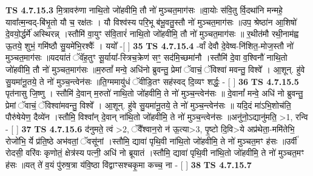 \documentclass[17pt]{extarticle}
\begin{document}
                  \newline
                                \textbf{ TS 4.7.15.3} \newline
                  मि॒त्रावरु॑णा नाथि॒तो जो॑हवीमि॒ तौ नो॑ मुञ्चत॒माग॑सः ॥वा॒योः स॑वि॒तु र्वि॒दथा॑नि मन्महे॒ यावा᳚त्म॒न्वद्-बि॑भृ॒तो यौ च॒ रक्ष॑तः । यौ विश्व॑स्य परि॒भू ब॑भू॒वतु॒स्तौ नो॑ मुञ्चत॒माग॑सः ॥उप॒ श्रेष्ठा॑न आ॒शिषो॑ दे॒वयो॒र्द्धर्मे॑ अस्थिरन्न् ।स्तौमि॑ वा॒युꣳ स॑वि॒तारं॑ नाथि॒तो जो॑हवीमि॒ तौ नो॑ मुञ्चत॒माग॑सः ॥ र॒थीत॑मौ रथी॒नाम॑ह्व ऊ॒तये॒ शुभं॒ गमि॑ष्ठौ सु॒यमे॑भि॒रश्वैः᳚ । ययो᳚ -[  ] \textbf{  35} \newline
                  \newline
                                \textbf{ TS 4.7.15.4} \newline
                  -र्वां देवौ दे॒वेष्व-नि॑शित॒-मोज॒स्तौ नो॑ मुञ्चत॒माग॑सः ॥यदया॑तं ॅवॅह॒तुꣳ सू॒र्याया᳚-स्त्रिच॒क्रेण॑ सꣳ॒॒ सद॑मि॒च्छमा॑नौ ।स्तौमि॑ दे॒वा व॒श्विनौ॑ नाथि॒तो जो॑हवीमि॒ तौ नो॑ मुञ्चत॒माग॑सः ॥म॒रुतां᳚ मन्वे॒ अधि॑नो ब्रुवन्तु॒ प्रेमां ॅवाचं॒ ॅविश्वा॑ मवन्तु॒ विश्वे᳚ । आ॒शून्. हु॑वे सु॒यमा॑नू॒तये॒ ते नो॑ मुञ्च॒न्त्वेन॑सः ॥ति॒ग्ममायु॑धं ॅवीडि॒तꣳ सह॑स्वद् दि॒व्यꣳ शर्द्धः॒ - [  ] \textbf{  36} \newline
                  \newline
                                \textbf{ TS 4.7.15.5} \newline
                  पृत॑नासु जि॒ष्णु । स्तौमि॑ दे॒वान् म॒रुतो॑ नाथि॒तो जो॑हवीमि॒ ते नो॑ मुञ्च॒न्त्वेन॑सः ॥ दे॒वानां᳚ मन्वे॒ अधि॑ नो ब्रुवन्तु॒ प्रेमां ॅवाचं॒ ॅविश्वा॑मवन्तु॒ विश्वे᳚ । आ॒शून्. हु॑वे सु॒यमा॑नू॒तये॒ ते नो॑ मुञ्च॒न्त्वेन॑सः ॥ यदि॒दं मा॑ऽभि॒शोच॑ति॒ पौरु॑षेयेण॒ दैव्ये॑न ।स्तौमि॒ विश्वा᳚न् दे॒वान् ना॑थि॒तो जो॑हवीमि॒ ते नो॑ मुञ्च॒न्त्वेन॑सः ॥अनु॑नो॒ऽद्यानु॑मति॒ >1, रन्वि - [  ] \textbf{  37} \newline
                  \newline
                                \textbf{ TS 4.7.15.6} \newline
                  द॑नुमते॒ त्वं >2, ॅवै᳚श्वान॒रो न॑ ऊ॒त्या>3, पृ॒ष्टो दि॒वि>ये अप्र॑थेता॒-ममि॑तेभि॒ रोजो॑भि॒ र्ये प्र॑ति॒ष्ठे अभ॑वतां॒ ॅवसू॑नां ।स्तौमि॒ द्यावा॑ पृथि॒वी ना॑थि॒तो जो॑हवीमि॒ ते नो॑ मुञ्चत॒मꣳ ह॑सः ॥उर्वी॑ रोदसी॒ वरि॑वः कृणोतं॒ क्षेत्र॑स्य पत्नी॒ अधि॑ नो ब्रूयातं ।स्तौमि॒ द्यावा॑ पृथि॒वी ना॑थि॒तो जो॑हवीमि॒ ते नो॑ मुञ्चत॒मꣳ ह॑सः ॥यत् ते॑ व॒यं पु॑रुष॒त्रा य॑वि॒ष्ठा वि॑द्वाꣳसश्चकृ॒मा कच्च॒ ना - [  ] \textbf{  38} \newline
                  \newline
                                \textbf{ TS 4.7.15.7} \newline
\end{document}

